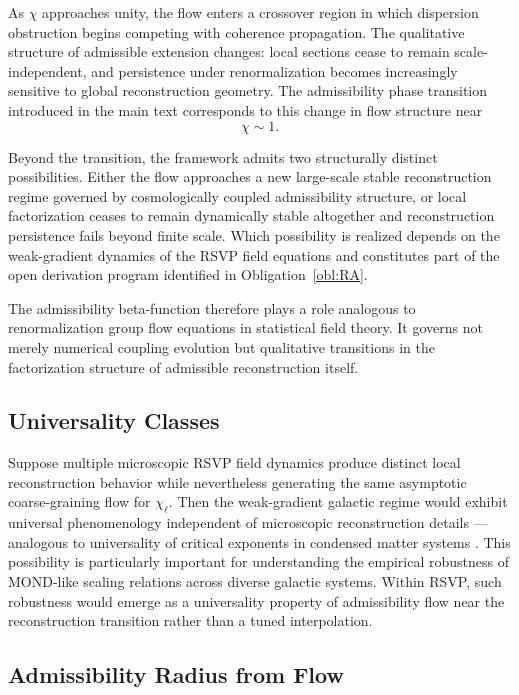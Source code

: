 \documentclass[11pt, a4paper]{article}
\theoremstyle{plain}
\theoremstyle{definition}
\theoremstyle{remark}
\begin{document}
As $\chi$ approaches unity, the flow enters a crossover region in which dispersion
obstruction begins competing with coherence propagation.  The qualitative structure
of admissible extension changes: local sections cease to remain scale-independent,
and persistence under renormalization becomes increasingly sensitive to global
reconstruction geometry.  The admissibility phase transition introduced in the main
text corresponds to this change in flow structure near
\[
  \chi \sim 1.
\]

Beyond the transition, the framework admits two structurally distinct possibilities.
Either the flow approaches a new large-scale stable reconstruction regime governed
by cosmologically coupled admissibility structure, or local factorization ceases to
remain dynamically stable altogether and reconstruction persistence fails beyond
finite scale.  Which possibility is realized depends on the weak-gradient dynamics
of the RSVP field equations and constitutes part of the open derivation program
identified in Obligation~\ref{obl:RA}.

The admissibility beta-function therefore plays a role analogous to renormalization
group flow equations in statistical field theory.  It governs not merely numerical
coupling evolution but qualitative transitions in the factorization structure of
admissible reconstruction itself.

\subsection{Universality Classes}

Suppose multiple microscopic RSVP field dynamics produce distinct local
reconstruction behavior while nevertheless generating the same asymptotic
coarse-graining flow for $\chi_\ell$. Then the weak-gradient galactic regime would
exhibit universal phenomenology independent of microscopic reconstruction details ---
analogous to universality of critical exponents in condensed matter systems
\cite{goldenfeld1992}. This possibility is particularly important for understanding
the empirical robustness of MOND-like scaling relations \cite{mcgaugh2011,famaey2012}
across diverse galactic systems. Within RSVP, such robustness would emerge as a
universality property of admissibility flow near the reconstruction transition rather
than a tuned interpolation.

\subsection{Admissibility Radius from Flow}
\end{document}
